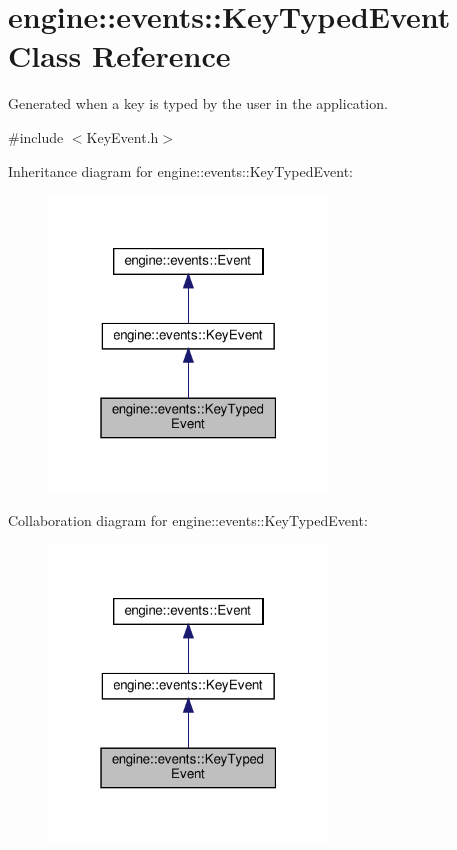 \hypertarget{classengine_1_1events_1_1KeyTypedEvent}{}\section{engine\+:\+:events\+:\+:Key\+Typed\+Event Class Reference}
\label{classengine_1_1events_1_1KeyTypedEvent}


Generated when a key is typed by the user in the application.  




{\ttfamily \#include $<$Key\+Event.\+h$>$}



Inheritance diagram for engine\+:\+:events\+:\+:Key\+Typed\+Event\+:\nopagebreak
\begin{figure}[H]
\begin{center}
\leavevmode
\includegraphics[width=211pt]{classengine_1_1events_1_1KeyTypedEvent__inherit__graph}
\end{center}
\end{figure}


Collaboration diagram for engine\+:\+:events\+:\+:Key\+Typed\+Event\+:\nopagebreak
\begin{figure}[H]
\begin{center}
\leavevmode
\includegraphics[width=211pt]{classengine_1_1events_1_1KeyTypedEvent__coll__graph}
\end{center}
\end{figure}
